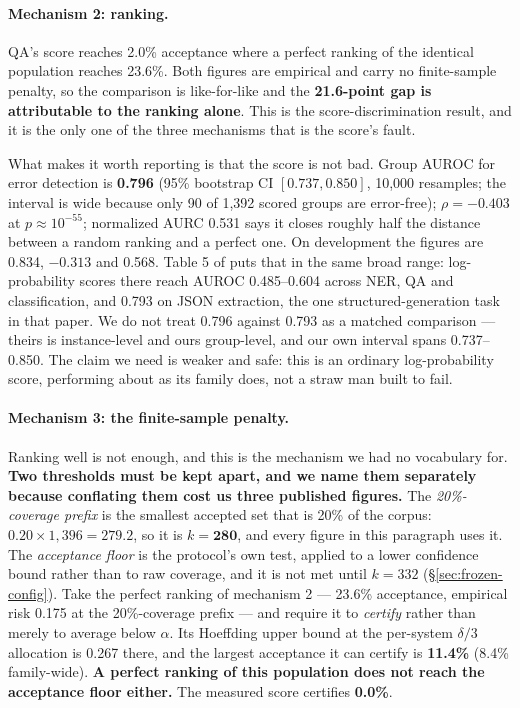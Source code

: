 \documentclass[11pt]{article}
\begin{document}
\paragraph{Mechanism 2: ranking.} QA's score reaches 2.0\% acceptance where a perfect ranking of
the identical population reaches 23.6\%. Both figures are empirical and carry no finite-sample
penalty, so the comparison is like-for-like and the \textbf{21.6-point gap is attributable to the
ranking alone}. This is the score-discrimination result, and it is the only one of the three
mechanisms that is the score's fault.

What makes it worth reporting is that the score is not bad. Group AUROC for error detection is
\textbf{0.796} (95\% bootstrap CI $[0.737, 0.850]$, 10{,}000 resamples; the interval is wide
because only 90 of 1{,}392 scored groups are error-free); $\rho = -0.403$ at $p \approx 10^{-55}$;
normalized AURC 0.531 says it closes roughly half the distance between a random ranking and a
perfect one. On development the figures are 0.834, $-0.313$ and 0.568. Table 5 of
\citet{kotte2026crc} puts that in the same broad range: log-probability scores there reach AUROC
0.485--0.604 across NER, QA and classification, and 0.793 on JSON extraction, the one
structured-generation task in that paper. We do not treat 0.796 against 0.793 as a matched
comparison --- theirs is instance-level and ours group-level, and our own interval spans
0.737--0.850. The claim we need is weaker and safe: this is an ordinary log-probability score,
performing about as its family does, not a straw man built to fail.

\paragraph{Mechanism 3: the finite-sample penalty.} Ranking well is not enough, and this is the
mechanism we had no vocabulary for. \textbf{Two thresholds must be kept apart, and we name them
separately because conflating them cost us three published figures.} The
\emph{20\%-coverage prefix} is the smallest accepted set that is 20\% of the corpus:
$0.20 \times 1{,}396 = 279.2$, so it is $k = \mathbf{280}$, and every figure in this paragraph uses
it. The \emph{acceptance floor} is the protocol's own test, applied to a lower confidence bound
rather than to raw coverage, and it is not met until $k = 332$ (\S\ref{sec:frozen-config}). Take
the perfect ranking of mechanism 2 --- 23.6\% acceptance, empirical risk 0.175 at the
20\%-coverage prefix --- and require it to \emph{certify} rather than merely to average below
$\alpha$. Its Hoeffding upper bound at the per-system $\delta/3$ allocation is 0.267 there, and the
largest acceptance it can certify is \textbf{11.4\%} (8.4\% family-wide). \textbf{A perfect ranking
of this population does not reach the acceptance floor either.} The measured score certifies
\textbf{0.0\%}.
\end{document}
